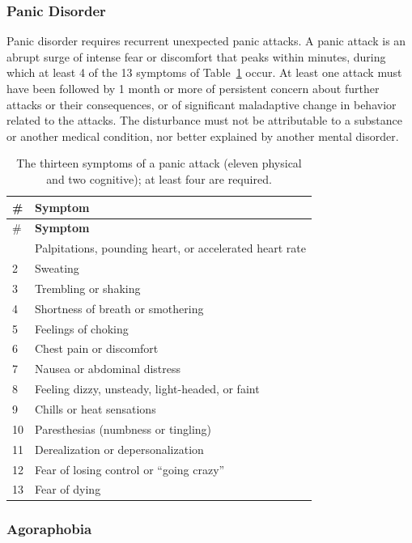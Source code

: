 \subsubsection{Panic Disorder}

Panic disorder requires recurrent unexpected panic attacks. A panic
attack is an abrupt surge of intense fear or discomfort that peaks within
minutes, during which at least 4 of the 13 symptoms of
Table~\ref{tab:panic-symptoms} occur. At least one attack must have been followed
by 1 month or more of persistent concern about further attacks or their
consequences, or of significant maladaptive change in behavior related to the
attacks. The disturbance must not be attributable to a substance or another
medical condition, nor better explained by another mental disorder.

\begin{longtable}{@{}p{}p{}@{}}
  \caption{The thirteen symptoms of a panic attack (eleven physical and two
  cognitive); at least four are required.}\label{tab:panic-symptoms}\\
  \toprule
  \# & \textbf{Symptom} \\
  \midrule
  \endfirsthead
  \toprule
  \# & \textbf{Symptom} \\
  \midrule
  \endhead
  \bottomrule
  \endlastfoot
  1 & Palpitations, pounding heart, or accelerated heart rate \\
  2 & Sweating \\
  3 & Trembling or shaking \\
  4 & Shortness of breath or smothering \\
  5 & Feelings of choking \\
  6 & Chest pain or discomfort \\
  7 & Nausea or abdominal distress \\
  8 & Feeling dizzy, unsteady, light-headed, or faint \\
  9 & Chills or heat sensations \\
  10 & Paresthesias (numbness or tingling) \\
  11 & Derealization or depersonalization \\
  12 & Fear of losing control or ``going crazy'' \\
  13 & Fear of dying \\
\end{longtable}

\subsubsection{Agoraphobia}

